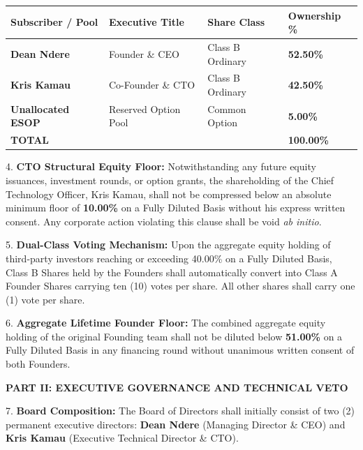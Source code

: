 \documentclass[11pt,a4paper]{article}
\begin{document}
\vspace{0.2cm}
\begin{table}[h!]
\centering
\small
\begin{tabularx}{\textwidth}{@{} X p{4.5cm} >{\raggedleft\arraybackslash}X >{\raggedleft\arraybackslash}X @{}}
    \toprule
    \textbf{\color{CorporateNavy} Subscriber / Pool} & \textbf{\color{CorporateNavy} Executive Title} & \textbf{\color{CorporateNavy} Share Class} & \textbf{\color{CorporateNavy} Ownership \%} \\
    \midrule
    \textbf{Dean Ndere} & Founder \& CEO & Class B Ordinary & \textbf{52.50\%} \\
    \textbf{Kris Kamau} & Co-Founder \& CTO & Class B Ordinary & \textbf{42.50\%} \\
    \textbf{Unallocated ESOP} & Reserved Option Pool & Common Option & \textbf{5.00\%} \\
    \midrule
    \textbf{\color{CorporateNavy} TOTAL} & & & \textbf{\color{CorporateNavy} 100.00\%} \\
    \bottomrule
\end{tabularx}
\end{table}

4. \textbf{CTO Structural Equity Floor:} Notwithstanding any future equity issuances, investment rounds, or option grants, the shareholding of the Chief Technology Officer, Kris Kamau, shall not be compressed below an absolute minimum floor of \textbf{10.00\%} on a Fully Diluted Basis without his express written consent. Any corporate action violating this clause shall be void \textit{ab initio}.

5. \textbf{Dual-Class Voting Mechanism:} Upon the aggregate equity holding of third-party investors reaching or exceeding 40.00\% on a Fully Diluted Basis, Class B Shares held by the Founders shall automatically convert into Class A Founder Shares carrying ten (10) votes per share. All other shares shall carry one (1) vote per share.

6. \textbf{Aggregate Lifetime Founder Floor:} The combined aggregate equity holding of the original Founding team shall not be diluted below \textbf{51.00\%} on a Fully Diluted Basis in any financing round without unanimous written consent of both Founders.

\vspace{0.4cm}
\textbf{\color{CorporateNavy} PART II: EXECUTIVE GOVERNANCE AND TECHNICAL VETO}

7. \textbf{Board Composition:} The Board of Directors shall initially consist of two (2) permanent executive directors: \textbf{Dean Ndere} (Managing Director \& CEO) and \textbf{Kris Kamau} (Executive Technical Director \& CTO). 
\end{document}
